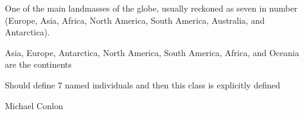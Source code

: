 \documentclass[letterpaper,10pt,english]{sphinxmanual}
\begin{document}
\begin{sphinxShadowBox}

\sphinxAtStartPar
{\hyperref[\detokenize{doc-ORG_0000045::doc}]{}}
\end{sphinxShadowBox}

\begin{sphinxShadowBox}

\sphinxAtStartPar
One of the main landmasses of the globe, usually reckoned as seven in number (Europe, Asia, Africa, North America, South America, Australia, and Antarctica).
\end{sphinxShadowBox}

\begin{sphinxShadowBox}

\sphinxAtStartPar
{}
\end{sphinxShadowBox}

\begin{sphinxShadowBox}

\sphinxAtStartPar
Asia, Europe, Antarctica, North America, South America, Africa, and Oceania are the continents
\end{sphinxShadowBox}

\begin{sphinxShadowBox}

\sphinxAtStartPar
Should define 7 named individuals and then this class is explicitly defined
\end{sphinxShadowBox}

\begin{sphinxShadowBox}

\sphinxAtStartPar
{}
\end{sphinxShadowBox}

\begin{sphinxShadowBox}

\sphinxAtStartPar
Michael Conlon 
\end{sphinxShadowBox}
\begin{quote}

\ignorespaces \end{quote}
\end{document}
